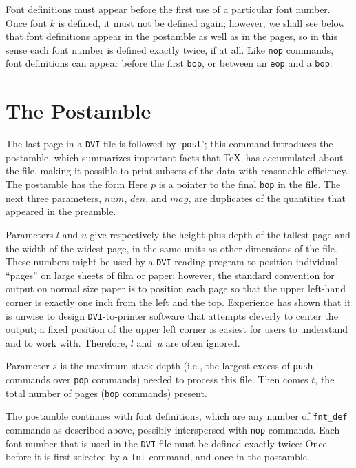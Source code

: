 \documentclass[10pt, a4paper]{article}
\begin{document}
Font definitions must appear before the first use of a particular font number.
Once font $k$ is defined, it must not be defined again; 
however, we shall see below 
that font definitions appear in the postamble as well as in the pages, 
so in this sense each font number is defined exactly twice, if at all. 
Like \texttt{nop} commands, 
font definitions can appear before the first \texttt{bop}, 
or between an \texttt{eop} and a \texttt{bop}. 

\section{The Postamble}\label{sec:postamble}

The last page in a \texttt{DVI} file is followed by `\texttt{post}'; 
this command introduces the postamble, 
which summarizes important facts that \TeX\ has accumulated about the file, 
making it possible to print subsets of the data with reasonable efficiency. 
The postamble has the form
Here $p$ is a pointer to the final \texttt{bop} in the file. The next three
parameters, $num$, $den$, and $mag$, are duplicates of the quantities that
appeared in the preamble.

Parameters $l$ and $u$ give respectively the height-plus-depth of the tallest
page and the width of the widest page, in the same units as other dimensions
of the file. These numbers might be used by a \texttt{DVI}-reading program to
position individual ``pages'' on large sheets of film or paper; however,
the standard convention for output on normal size paper is to position each
page so that the upper left-hand corner is exactly one inch from the left
and the top. 
Experience has shown that it is unwise to design \texttt{DVI}-to-printer
software that attempts cleverly to center the output; a fixed position of
the upper left corner is easiest for users to understand and to work with.
Therefore, $l$ and~$u$ are often ignored.

Parameter $s$ is the maximum stack depth 
(i.e., 
the largest excess of \texttt{push} commands over \texttt{pop} commands)
 needed to process this file. 
Then comes $t$, the total number of pages (\texttt{bop} commands) present.

The postamble continues with font definitions, 
which are any number of \texttt{fnt\_def} commands as described above, 
possibly interspersed with \texttt{nop} commands. 
Each font number that is used in the \texttt{DVI} file must be defined
exactly twice: Once before it is first selected by a \texttt{fnt} command, 
and once in the postamble.
\end{document}

